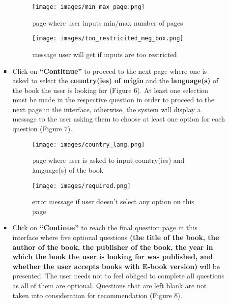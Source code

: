 \documentclass[fontsize=11pt]{article}
\begin{document}
\begin{itemize}
\begin{itemize}
\begin{itemize}
            \begin{figure}[h!]
                \centering
                \texttt{[image: images/min\_max\_page.png]}
                \caption{page where user inputs min/max number of pages}
                \label{fig:x cubed graph}
            \end{figure}
            \begin{figure}[h!]
                \centering
                \texttt{[image: images/too\_restricited\_meg\_box.png]}
                \caption{message user will get if inputs are too restricted}
                \label{fig:x cubed graph}
            \end{figure}
            \item Click on \textbf{``Contitnue''} to proceed to the next page where one is asked to select the \textbf{country(ies) of origin} and the \textbf{language(s)} of the book the user is looking for (Figure 6). At least one selection must be made in the respective question in order to proceed to the next page in the interface, otherwise, the system will display a message to the user asking them to choose at least one option for each question (Figure 7).
            \begin{figure}[h!]
                \centering
                \texttt{[image: images/country\_lang.png]}
                \caption{page where user is asked to input country(ies) and language(s) of the book}
                \label{fig:x cubed graph}
            \end{figure}
            \begin{figure}[h!]
                \centering
                \texttt{[image: images/required.png]}
                \caption{error message if user doesn't select any option on this page}
                \label{fig:x cubed graph}
            \end{figure}
            \item Click on \textbf{``Continue''} to reach the final question page in this interface where five optional questions \textbf{(the title of the book, the author of the book, the publisher of the book, the year in which the book the user is looking for was published, and whether the user accepts books with E-book version)} will be presented. The user needs not to feel obliged to complete all questions as all of them are optional. Questions that are left blank are not taken into consideration for recommendation (Figure 8).
            \begin{figure}[h!]
                \centering

\end{figure}
\end{itemize}
\end{itemize}
\end{itemize}
\end{document}
